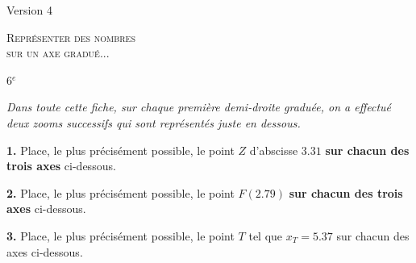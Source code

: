 \documentclass[a4paper,10pt,fleqn,twocolumn,landscape]{article}
\newcommand{\axesZoomBis}[5]{
{} \hfill 
\begin{tikzpicture}
	\def\XA{#1} %
	\def\Nom{#2} %
	\def\Xmin{#3} %
	\setboolean{affichePointilles}{true}  %
	\setboolean{affichePoint}{#4} %
	\setboolean{afficheGraduations}{#5} %
	\setboolean{demiDroite}{true} %
	
	
	\ifthenelse{\boolean{demiDroite}}
	{
		\def\DebordementAGauche{0} %
	}
	{
		\def\DebordementAGauche{0.5} %
	}	
	
	\pgfmathparse{int(\Xmin+10)}\let\Xmax\pgfmathresult; %
		
	\pgfmathparse{int(\XA)}\let\Unites\pgfmathresult;
	\pgfmathparse{int((\XA-\Unites)*10)}\let\Dixiemes\pgfmathresult;
	\pgfmathparse{int(round((\XA-\Unites.\Dixiemes)*100))}\let\Centiemes\pgfmathresult;	

	\pgfmathparse{int(\Unites+1)}\let\UnitesMaj\pgfmathresult;
	\pgfmathparse{int(\Dixiemes+1)}\let\DixiemesMaj\pgfmathresult;
	\pgfmathparse{int(\Centiemes+1)}\let\CentiemesMaj\pgfmathresult;				

	\pgfmathparse{\Xmax+1}\let\Xfleche\pgfmathresult;
	\ifthenelse{\equal{\Xmin}{0}}
	{
		\def\Xorigine{\Xmin} 	
	}
	{
		\pgfmathparse{\Xmin-0.5}\let\Xorigine\pgfmathresult;	
	}

	\pgfmathparse{int(\Xmax-1)}\let\XmaxMoinsUn\pgfmathresult;
	\pgfmathparse{int(\Xmin+1)}\let\XminPlusUn\pgfmathresult;
		
	
	\draw[->,>=latex] (\Xorigine,0) -- (\Xfleche,0);
	\foreach \x in {\XminPlusUn,...,\XmaxMoinsUn}{
		\ifthenelse{\boolean{afficheGraduations}}
		{
			\draw (\x,-.1) -- (\x,.1) node[above] {\x};
		}
		{
			\draw (\x,-.1) -- (\x,.1);
		}
	};
	\foreach \x in {1,...,9}{
		\draw (\Unites.\x,-.05) -- (\Unites.\x,.05);
	}
	\draw (\Xmin,-.1) -- (\Xmin,.1) node[above] {\Xmin};
	\draw (\Xmax,-.1) -- (\Xmax,.1) node[above] {\Xmax};
	\ifthenelse{\not\equal{\Unites}{0}}
	{
		\pgfmathparse{\Xmin-0.5}\let\Xorigine\pgfmathresult;		
	}{}
	\draw[->,>=latex] (\Xorigine,-2) -- (\Xfleche,-2);
	\foreach \x in {1,...,9}{
		\pgfmathparse{int(\Xmin+\x)}\let\X\pgfmathresult;
		\ifthenelse{\boolean{afficheGraduations}}
		{
			\draw (\X,-2.1) -- (\X,-1.9) node[above] {\Unites,\x};
		}
		{
			\draw (\X,-2.1) -- (\X,-1.9);
		}		
		\pgfmathparse{int(\Dixiemes+\Xmin)+\x/10}\let\Xtirets\pgfmathresult;
		\draw (\Xtirets,-2.05) -- (\Xtirets,-1.95);
	};
	
	\ifthenelse{\boolean{afficheGraduations}}
	{	
		\draw (\Xmax,-2.1) -- (\Xmax,-1.9) node[above] {\UnitesMaj};
		\draw (\Xmin,-2.1) -- (\Xmin,-1.9) node[above] {\Unites};
	}
	{
		\draw (\Xmax,-2.1) -- (\Xmax,-1.9) ;
		\draw (\Xmin,-2.1) -- (\Xmin,-1.9) ;		
	}
	
	\pgfmathparse{int(\Dixiemes+\Xmin)}\let\XGaucheAxeBis\pgfmathresult;
	\pgfmathparse{int(\XGaucheAxeBis+1)}\let\XDroitAxeBis\pgfmathresult;

	\ifthenelse{\boolean{affichePointilles}}
	{
	\draw[dashed] (\Unites,0) -- (\Xmin,-2);
	\draw[dashed] (\UnitesMaj,0) -- (\Xmax,-2);
	\draw[dashed] (\XGaucheAxeBis,-2) -- (\Xmin,-4);
	\draw[dashed] (\XDroitAxeBis,-2) -- (\Xmax,-4);
	}{}
	
	\ifthenelse{\not\equal{\Dixiemes}{0}}
	{
		\pgfmathparse{\Xmin-0.5}\let\Xorigine\pgfmathresult;		
	}{}
	\draw[->,>=latex] (\Xorigine,-4) -- (\Xfleche,-4);
	\foreach \x in {1,...,9}{
		\pgfmathparse{int(\Xmin+\x)}\let\X\pgfmathresult;
		\ifthenelse{\boolean{afficheGraduations}}
			{
			\draw (\X,-4.1) -- (\X,-3.9) node[above] {\Unites,\Dixiemes\x};
			}
			{
			\draw (\X,-4.1) -- (\X,-3.9) ;
			}
		};

	
\ifthenelse{\boolean{afficheGraduations}}
	{
	\ifthenelse{\equal{\Dixiemes}{9}}
		{
		\draw (\Xmax,-4.1) -- (\Xmax,-3.9) node[above] {\UnitesMaj};		
		}	
		{
		\draw (\Xmax,-4.1) -- (\Xmax,-3.9) node[above] {\Unites,\DixiemesMaj};
		}	
	
	\ifthenelse{\equal{\Dixiemes}{0}}
		{
		\draw (\Xmin,-4.1) -- (\Xmin,-3.9) node[above] {\Unites};
		}
		{
		\draw (\Xmin,-4.1) -- (\Xmin,-3.9) node[above] {\Unites,\Dixiemes};	
		}
	}
	{
	\ifthenelse{\equal{\Dixiemes}{9}}
		{
		\draw (\Xmax,-4.1) -- (\Xmax,-3.9);		
		}	
		{
		\draw (\Xmax,-4.1) -- (\Xmax,-3.9) ;
		}	
	
	\ifthenelse{\equal{\Dixiemes}{0}}
		{
		\draw (\Xmin,-4.1) -- (\Xmin,-3.9) ;
		}
		{
		\draw (\Xmin,-4.1) -- (\Xmin,-3.9) ;	
		}
	\pgfmathparse{int(\Centiemes+\Xmin)}\let\XGaucheAxeTer\pgfmathresult;
	\draw (\XGaucheAxeTer,-4.1) node[below] {\Nom};
	}
	
	\ifthenelse{\boolean{affichePoint}}
	{
		\draw (\XA,0) node[below] {\Nom};
		\draw (\XGaucheAxeBis.\Centiemes,-2.1) node[below] {\Nom};
	}{}
	
	\draw (7,0) node[below] {$D$};
	\draw (6,-2.1) node[below] {$E$};
\end{tikzpicture}
}
\newcommand{\axesZoomTer}[5]{
{} \hfill 
\begin{tikzpicture}
	\def\XA{#1} %
	\def\Nom{#2} %
	\def\Xmin{#3} %
	\setboolean{affichePointilles}{true}  %
	\setboolean{affichePoint}{#4} %
	\setboolean{afficheGraduations}{#5} %
	\setboolean{demiDroite}{true} %
	
	
	\ifthenelse{\boolean{demiDroite}}
	{
		\def\DebordementAGauche{0} %
	}
	{
		\def\DebordementAGauche{0.5} %
	}	
	
	\pgfmathparse{int(\Xmin+10)}\let\Xmax\pgfmathresult; %
		
	\pgfmathparse{int(\XA)}\let\Unites\pgfmathresult;
	\pgfmathparse{int((\XA-\Unites)*10)}\let\Dixiemes\pgfmathresult;
	\pgfmathparse{int(round((\XA-\Unites.\Dixiemes)*100))}\let\Centiemes\pgfmathresult;	

	\pgfmathparse{int(\Unites+1)}\let\UnitesMaj\pgfmathresult;
	\pgfmathparse{int(\Dixiemes+1)}\let\DixiemesMaj\pgfmathresult;
	\pgfmathparse{int(\Centiemes+1)}\let\CentiemesMaj\pgfmathresult;				

	\pgfmathparse{\Xmax+1}\let\Xfleche\pgfmathresult;
	\ifthenelse{\equal{\Xmin}{0}}
	{
		\def\Xorigine{\Xmin} 	
	}
	{
		\pgfmathparse{\Xmin-0.5}\let\Xorigine\pgfmathresult;	
	}

	\pgfmathparse{int(\Xmax-1)}\let\XmaxMoinsUn\pgfmathresult;
	\pgfmathparse{int(\Xmin+1)}\let\XminPlusUn\pgfmathresult;
		
	
	\draw[->,>=latex] (\Xorigine,0) -- (\Xfleche,0);
	\foreach \x in {\XminPlusUn,...,\XmaxMoinsUn}{
		\ifthenelse{\boolean{afficheGraduations}}
		{
			\draw (\x,-.1) -- (\x,.1) node[above] {\x};
		}
		{
			\draw (\x,-.1) -- (\x,.1);
		}
	};
	\foreach \x in {1,...,9}{
		\draw (\Unites.\x,-.05) -- (\Unites.\x,.05);
	}
	\draw (\Xmin,-.1) -- (\Xmin,.1) node[above] {\Xmin};
	\draw (\Xmax,-.1) -- (\Xmax,.1) node[above] {\Xmax};
	\ifthenelse{\not\equal{\Unites}{0}}
	{
		\pgfmathparse{\Xmin-0.5}\let\Xorigine\pgfmathresult;		
	}{}
	\draw[->,>=latex] (\Xorigine,-2) -- (\Xfleche,-2);
	\foreach \x in {1,...,9}{
		\pgfmathparse{int(\Xmin+\x)}\let\X\pgfmathresult;
		\ifthenelse{\boolean{afficheGraduations}}
		{
			\draw (\X,-2.1) -- (\X,-1.9) node[above] {\Unites,\x};
		}
		{
			\draw (\X,-2.1) -- (\X,-1.9);
		}		
		\pgfmathparse{int(\Dixiemes+\Xmin)+\x/10}\let\Xtirets\pgfmathresult;
		\draw (\Xtirets,-2.05) -- (\Xtirets,-1.95);
	};
	
	\ifthenelse{\boolean{afficheGraduations}}
	{	
		\draw (\Xmax,-2.1) -- (\Xmax,-1.9) node[above] {\UnitesMaj};
		\draw (\Xmin,-2.1) -- (\Xmin,-1.9) node[above] {\Unites};
	}
	{
		\draw (\Xmax,-2.1) -- (\Xmax,-1.9) ;
		\draw (\Xmin,-2.1) -- (\Xmin,-1.9) ;		
	}
	
	\pgfmathparse{int(\Dixiemes+\Xmin)}\let\XGaucheAxeBis\pgfmathresult;
	\pgfmathparse{int(\XGaucheAxeBis+1)}\let\XDroitAxeBis\pgfmathresult;

	\ifthenelse{\boolean{affichePointilles}}
	{
	\draw[dashed] (\Unites,0) -- (\Xmin,-2);
	\draw[dashed] (\UnitesMaj,0) -- (\Xmax,-2);
	\draw[dashed] (\XGaucheAxeBis,-2) -- (\Xmin,-4);
	\draw[dashed] (\XDroitAxeBis,-2) -- (\Xmax,-4);
	}{}
	
	\ifthenelse{\not\equal{\Dixiemes}{0}}
	{
		\pgfmathparse{\Xmin-0.5}\let\Xorigine\pgfmathresult;		
	}{}
	\draw[->,>=latex] (\Xorigine,-4) -- (\Xfleche,-4);
	\foreach \x in {1,...,9}{
		\pgfmathparse{int(\Xmin+\x)}\let\X\pgfmathresult;
		\ifthenelse{\boolean{afficheGraduations}}
			{
			\draw (\X,-4.1) -- (\X,-3.9) node[above] {\Unites,\Dixiemes\x};
			}
			{
			\draw (\X,-4.1) -- (\X,-3.9) ;
			}
		};

	
\ifthenelse{\boolean{afficheGraduations}}
	{
	\ifthenelse{\equal{\Dixiemes}{9}}
		{
		\draw (\Xmax,-4.1) -- (\Xmax,-3.9) node[above] {\UnitesMaj};		
		}	
		{
		\draw (\Xmax,-4.1) -- (\Xmax,-3.9) node[above] {\Unites,\DixiemesMaj};
		}	
	
	\ifthenelse{\equal{\Dixiemes}{0}}
		{
		\draw (\Xmin,-4.1) -- (\Xmin,-3.9) node[above] {\Unites};
		}
		{
		\draw (\Xmin,-4.1) -- (\Xmin,-3.9) node[above] {\Unites,\Dixiemes};	
		}
	}
	{
	\ifthenelse{\equal{\Dixiemes}{9}}
		{
		\draw (\Xmax,-4.1) -- (\Xmax,-3.9);		
		}	
		{
		\draw (\Xmax,-4.1) -- (\Xmax,-3.9) ;
		}	
	
	\ifthenelse{\equal{\Dixiemes}{0}}
		{
		\draw (\Xmin,-4.1) -- (\Xmin,-3.9) ;
		}
		{
		\draw (\Xmin,-4.1) -- (\Xmin,-3.9) ;	
		}
	\pgfmathparse{int(\Centiemes+\Xmin)}\let\XGaucheAxeTer\pgfmathresult;
	\draw (\XGaucheAxeTer,-4.1) node[below] {\Nom};
	}
	
	\ifthenelse{\boolean{affichePoint}}
	{
		\draw (\XA,0) node[below] {\Nom};
		\draw (\XGaucheAxeBis.\Centiemes,-2.1) node[below] {\Nom};
	}{}
	
	\draw (10,0) node[below] {$G$};
	\draw (5,-2.1) node[below] {$H$};
	\draw (11,-4.1) node[below] {$I$};
\end{tikzpicture}
}
\newcommand{\axesZoomTerBis}[5]{
{} \hfill 
\begin{tikzpicture}
	\def\XA{#1} %
	\def\Nom{#2} %
	\def\Xmin{#3} %
	\setboolean{affichePointilles}{true}  %
	\setboolean{affichePoint}{#4} %
	\setboolean{afficheGraduations}{#5} %
	\setboolean{demiDroite}{true} %
	
	
	\ifthenelse{\boolean{demiDroite}}
	{
		\def\DebordementAGauche{0} %
	}
	{
		\def\DebordementAGauche{0.5} %
	}	
	
	\pgfmathparse{int(\Xmin+10)}\let\Xmax\pgfmathresult; %
		
	\pgfmathparse{int(\XA)}\let\Unites\pgfmathresult;
	\pgfmathparse{int((\XA-\Unites)*10)}\let\Dixiemes\pgfmathresult;
	\pgfmathparse{int(round((\XA-\Unites.\Dixiemes)*100))}\let\Centiemes\pgfmathresult;	

	\pgfmathparse{int(\Unites+1)}\let\UnitesMaj\pgfmathresult;
	\pgfmathparse{int(\Dixiemes+1)}\let\DixiemesMaj\pgfmathresult;
	\pgfmathparse{int(\Centiemes+1)}\let\CentiemesMaj\pgfmathresult;				

	\pgfmathparse{\Xmax+1}\let\Xfleche\pgfmathresult;
	\ifthenelse{\equal{\Xmin}{0}}
	{
		\def\Xorigine{\Xmin} 	
	}
	{
		\pgfmathparse{\Xmin-0.5}\let\Xorigine\pgfmathresult;	
	}

	\pgfmathparse{int(\Xmax-1)}\let\XmaxMoinsUn\pgfmathresult;
	\pgfmathparse{int(\Xmin+1)}\let\XminPlusUn\pgfmathresult;
		
	
	\draw[->,>=latex] (\Xorigine,0) -- (\Xfleche,0);
	\foreach \x in {\XminPlusUn,...,\XmaxMoinsUn}{
		\ifthenelse{\boolean{afficheGraduations}}
		{
			\draw (\x,-.1) -- (\x,.1) node[above] {\x};
		}
		{
			\draw (\x,-.1) -- (\x,.1);
		}
	};
	\foreach \x in {1,...,9}{
		\draw (\Unites.\x,-.05) -- (\Unites.\x,.05);
	}
	\draw (\Xmin,-.1) -- (\Xmin,.1) node[above] {\Xmin};
	\draw (\Xmax,-.1) -- (\Xmax,.1) node[above] {\Xmax};
	\ifthenelse{\not\equal{\Unites}{0}}
	{
		\pgfmathparse{\Xmin-0.5}\let\Xorigine\pgfmathresult;		
	}{}
	\draw[->,>=latex] (\Xorigine,-2) -- (\Xfleche,-2);
	\foreach \x in {1,...,9}{
		\pgfmathparse{int(\Xmin+\x)}\let\X\pgfmathresult;
		\ifthenelse{\boolean{afficheGraduations}}
		{
			\draw (\X,-2.1) -- (\X,-1.9) node[above] {\Unites,\x};
		}
		{
			\draw (\X,-2.1) -- (\X,-1.9);
		}		
		\pgfmathparse{int(\Dixiemes+\Xmin)+\x/10}\let\Xtirets\pgfmathresult;
		\draw (\Xtirets,-2.05) -- (\Xtirets,-1.95);
	};
	
	\ifthenelse{\boolean{afficheGraduations}}
	{	
		\draw (\Xmax,-2.1) -- (\Xmax,-1.9) node[above] {\UnitesMaj};
		\draw (\Xmin,-2.1) -- (\Xmin,-1.9) node[above] {\Unites};
	}
	{
		\draw (\Xmax,-2.1) -- (\Xmax,-1.9) ;
		\draw (\Xmin,-2.1) -- (\Xmin,-1.9) ;		
	}
	
	\pgfmathparse{int(\Dixiemes+\Xmin)}\let\XGaucheAxeBis\pgfmathresult;
	\pgfmathparse{int(\XGaucheAxeBis+1)}\let\XDroitAxeBis\pgfmathresult;

	\ifthenelse{\boolean{affichePointilles}}
	{
	\draw[dashed] (\Unites,0) -- (\Xmin,-2);
	\draw[dashed] (\UnitesMaj,0) -- (\Xmax,-2);
	\draw[dashed] (\XGaucheAxeBis,-2) -- (\Xmin,-4);
	\draw[dashed] (\XDroitAxeBis,-2) -- (\Xmax,-4);
	}{}
	
	\ifthenelse{\not\equal{\Dixiemes}{0}}
	{
		\pgfmathparse{\Xmin-0.5}\let\Xorigine\pgfmathresult;		
	}{}
	\draw[->,>=latex] (\Xorigine,-4) -- (\Xfleche,-4);
	\foreach \x in {1,...,9}{
		\pgfmathparse{int(\Xmin+\x)}\let\X\pgfmathresult;
		\ifthenelse{\boolean{afficheGraduations}}
			{
			\draw (\X,-4.1) -- (\X,-3.9) node[above] {\Unites,\Dixiemes\x};
			}
			{
			\draw (\X,-4.1) -- (\X,-3.9) ;
			}
		};

	
\ifthenelse{\boolean{afficheGraduations}}
	{
	\ifthenelse{\equal{\Dixiemes}{9}}
		{
		\draw (\Xmax,-4.1) -- (\Xmax,-3.9) node[above] {\UnitesMaj};		
		}	
		{
		\draw (\Xmax,-4.1) -- (\Xmax,-3.9) node[above] {\Unites,\DixiemesMaj};
		}	
	
	\ifthenelse{\equal{\Dixiemes}{0}}
		{
		\draw (\Xmin,-4.1) -- (\Xmin,-3.9) node[above] {\Unites};
		}
		{
		\draw (\Xmin,-4.1) -- (\Xmin,-3.9) node[above] {\Unites,\Dixiemes};	
		}
	}
	{
	\ifthenelse{\equal{\Dixiemes}{9}}
		{
		\draw (\Xmax,-4.1) -- (\Xmax,-3.9);		
		}	
		{
		\draw (\Xmax,-4.1) -- (\Xmax,-3.9) ;
		}	
	
	\ifthenelse{\equal{\Dixiemes}{0}}
		{
		\draw (\Xmin,-4.1) -- (\Xmin,-3.9) ;
		}
		{
		\draw (\Xmin,-4.1) -- (\Xmin,-3.9) ;	
		}
	\pgfmathparse{int(\Centiemes+\Xmin)}\let\XGaucheAxeTer\pgfmathresult;
	\draw (\XGaucheAxeTer,-4.1) node[below] {\Nom};
	}
	
	\ifthenelse{\boolean{affichePoint}}
	{
		\draw (\XA,0) node[below] {\Nom};
		\draw (\XGaucheAxeBis.\Centiemes,-2.1) node[below] {\Nom};
	}{}
	
	\draw (25,0) node[below] {$L$};
	\draw (18,-2.1) node[below] {$M$};
	\draw (24,-4.1) node[below] {$N$};
\end{tikzpicture}
}
\begin{document}
\vfill
\newpage
\setcounter{section}{0}
\setcounter{exo}{0}   	

\begin{minipage}{0.15\linewidth}
Version 4
\end{minipage}\hfill
\begin{minipage}{0.75\linewidth}
\begin{center}
	\textsc{\Large{Représenter des nombres\\ sur un axe gradué...}}
\end{center}
\end{minipage}\hfill
\begin{minipage}{0.1\linewidth}
{} \hfill 6$^e$
\end{minipage}

\medskip

\textit{Dans toute cette fiche, sur chaque première demi-droite graduée, on a effectué deux zooms successifs qui sont représentés juste en dessous.}

\vfill




\textbf{1.} Place, le plus précisément possible, le point $Z$ d'abscisse $3.31$ \textbf{sur chacun des trois axes} ci-dessous.

\vfill

{} \hfill 
{}
\hfill {}

\vfill

\textbf{2.} Place, le plus précisément possible, le point $F (2.79)$ \textbf{sur chacun des trois axes} ci-dessous.

\vfill

{} \hfill 
{}
\hfill {}

\vfill

\textbf{3.} Place, le plus précisément possible, le point $T$ tel que $x_{T}=5.37$ sur chacun des axes ci-dessous.

\vfill

{} \hfill 
{}
\hfill {}

\vfill


%
%
%
%
%
%
%
%
%
%
%
%
%

\vfill
 
\end{document}
